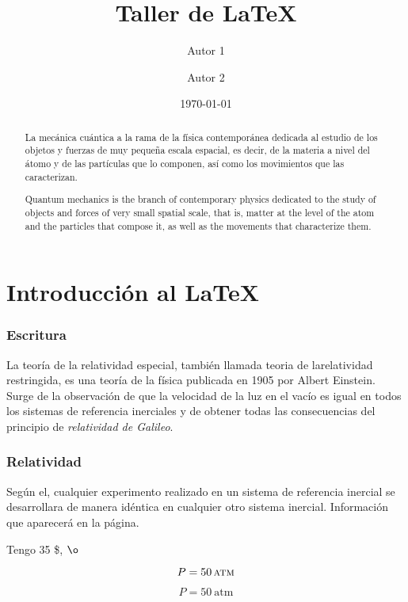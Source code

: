 \documentclass[12pt,a4paper]{article}
\title{Taller de \LaTeX}
\author{Autor 1\and Autor 2}
\date{\today}
\begin{document}
\maketitle
\newpage

\tableofcontents
\newpage
\begin{abstract}
La mecánica cuántica a la rama de la física contemporánea dedicada al estudio de los objetos y fuerzas de muy pequeña escala espacial, es decir, de la materia a nivel del átomo y de las partículas que lo componen, así como los movimientos que las caracterizan.
\end{abstract}
\renewcommand{\abstractname}{Abstract}
\begin{abstract}
Quantum mechanics is the branch of contemporary physics dedicated to the study of objects and forces of very small spatial scale, that is, matter at the level of the atom and the particles that compose it, as well as the movements that characterize them.
\end{abstract}

\part{Introducción al \LaTeX}
\section{Escritura}\label{introduccion}
La teoría de la relatividad especial, también llamada teoria de la\linebreak relatividad restringida, es una teoría de la física publicada en 1905 por Albert Einstein. Surge de la observación de que la velocidad de la luz en el vacío es igual en todos los sistemas de referencia inerciales y de obtener todas las consecuencias del principio de {\it \large relatividad de Galileo}.
\section{Relatividad}
Según el, cualquier experimento realizado en un sistema de {\sc referencia inercial} se desarrollara de manera idéntica en cualquier otro sistema inercial. Información que aparecerá en la página.

Tengo 35 \$, $\o$
 
$$P=50\,\textsc{atm}$$

\begin{equation}
\label{Atmos}
P=50~\text{atm}
\end{equation}
\end{document}

